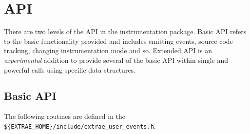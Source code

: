 \chapter{\TRACE API}\label{cha:API}

There are two levels of the API in the \TRACE instrumentation package. Basic API refers to the basic functionality provided and includes emitting events, source code tracking, changing instrumentation mode and so. Extended API is an {\em experimental} addition to provide several of the basic API within single and powerful calls using specific data structures.

\section{Basic API}\label{sec:BasicAPI}

The following routines are defined in the {\tt \$\{EXTRAE\_HOME\}/include/extrae\_user\_events.h}.

